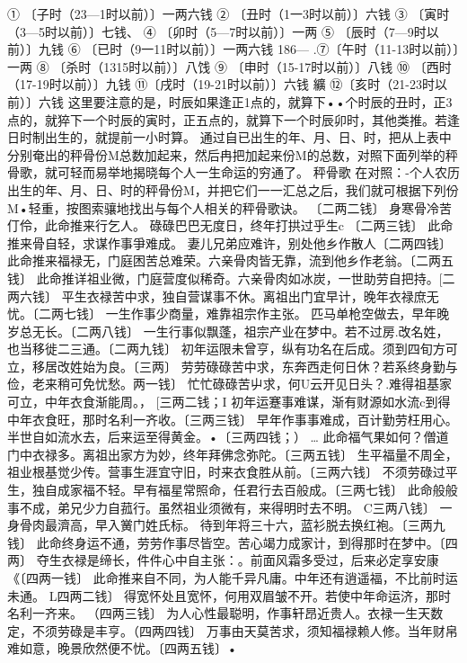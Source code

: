 {{①	〔子时（23—1时以前）〕一两六钱
②	〔丑时（1一3时以前）〕六钱
③	〔寅时（3—5时以前）〕七钱、
④	〔卯时（5—7时以前）〕一两
⑤	〔辰时（7—9时以前）〕九钱
⑥	〔已时（9一11时以前）〕一两六钱
186—
.⑦〔午时（11-13时以前）〕一两
⑧	〔杀时（1315时以前）〕八饯
⑨	〔申时（15-17时以前）〕八钱
⑩	〔西时（17-19时以前）〕九钱
⑪〔戌时（19-21时以前）〕六钱
纊
⑫〔亥时（21-23时以前）〕六钱
这里要注意的是，时辰如果逢正1点的，就算下••个时辰的丑时，正3点的，就猝下一个时辰的寅时，正五点的，就算下一个时辰卯时，其他类推。若逢日时制出生的，就提前一小时算。
通过自已出生的年、月、日、时，把从上表中分别奄出的秤骨份M总数加起来，然后冉把加起来份M的总数，对照下面列举的秤骨歌，就可轻而易举地揭晓每个人一生命运的穷通了。
秤骨歌
在对照：-个人农历出生的年、月、日、时的秤骨份M，并把它们一一汇总之后，我们就可根据下列份M•轻重，按图索骧地找出与每个人相关的秤骨歌诀。
〔二两二钱〕
身寒骨冷苦仃伶，此命推来行乞人。
碌碌巴巴无度日，终年打拱过乎生c
〔二两三钱〕
此命推来骨自轻，求谋作事爭难成。
妻儿兄弟应难许，别处他乡作散人〔二两四钱〕
此命推来福禄无，门庭困苦总难荣。六亲骨肉皆无靠，流到他乡作老翁。〔二两五钱〕
此命推详祖业微，门庭营度似稀奇。六亲骨肉如冰炭，一世助劳自把持。[二两六钱〕
平生衣禄苦中求，独自营谋事不休。离祖出门宜早计，晚年衣禄庶无忧。〔二两七钱〕
一生作事少商量，难靠祖宗作主张。
匹马单枪空做去，早年晚岁总无长。〔二两八钱〕
一生行事似飘蓬，祖宗产业在梦中。若不过房.改名姓，也当移徙二三通。〔二两九钱〕
初年运限未曾亨，纵有功名在后成。须到四旬方可立，移居改姓始为良。〔三两〕
劳劳碌碌苦中求，东奔西走何日休？若系终身勤与俭，老来稍可免忧愁。两一钱〕
忙忙碌碌苦屮求，何U云开见日头？.难得祖基家可立，中年衣食渐能周。，
[三两二钱；I
初年运蹇事难谋，渐有财源如水流c到得中年衣食旺，那时名利一齐收。〔三两三钱〕
早年作事事难成，百计勤劳枉用心。半世自如流水去，后来运至得黄金。•〔三两四钱；）	…
此命福气果如何？僧道门中衣禄多。离祖出家方为妙，终年拜佛念弥陀。〔三两五钱〕
生平福量不周全，祖业根基觉少传。营事生涯宜守旧，时来衣食胜从前。〔三两六钱〕
不须劳碌过平生，独自成家福不轻。早有福星常照命，任君行去百般成。〔三两七钱〕
此命般般事不成，弟兄少力自菰行。虽然祖业须微有，来得明时去不明。
C三两八钱〕
一身骨肉最濟高，早入黉门姓氏标。
待到年将三十六，蓝衫脱去换红袍。〔三两九钱〕
此命终身运不通，劳劳作事尽皆空。苦心竭力成家计，到得那时在梦中。〔四两〕
夺生衣禄是缔长，件件心中自主张：。前面风霜多受过，后来必定享安康《〔四两一钱〕
此命推来自不同，为人能千异凡庸。中年还有逍遥福，不比前时运未通。
L四两二钱〕
得宽怀处且宽怀，何用双眉皱不开。若使中年命运济，那时名利一齐来。
（四两三钱〕
为人心性最聪明，作事轩昂近贵人。衣禄一生天数定，不须劳碌是丰亨。（四两四钱〕
万事由天莫苦求，须知福禄赖人修。当年财帛难如意，晚景欣然便不忧。〔四两五钱〕•
}}
